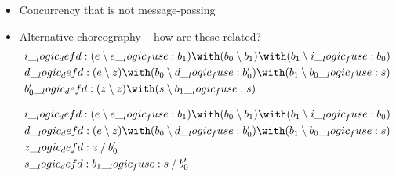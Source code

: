 \begin{itemize}
\item Concurrency that is not message-passing
\item Alternative choreography -- how are these related?
\begin{equation*}
  \begin{lgathered}
    i \defd (e \limp e \fuse b_1) \with (b_0 \limp b_1) \with (b_1 \limp i \fuse b_0) \\
    d \defd (e \limp z) \with (b_0 \limp d \fuse b'_0) \with (b_1 \limp b_0 \fuse s) \\
    b'_0 \defd (z \limp z) \with (s \limp b_1 \fuse s)
  \end{lgathered}
\end{equation*}

\begin{equation*}
  \begin{lgathered}
    i \defd (e \limp e \fuse b_1) \with (b_0 \limp b_1) \with (b_1 \limp i \fuse b_0) \\
    d \defd (e \limp z) \with (b_0 \limp d \fuse b'_0) \with (b_1 \limp b_0 \fuse s) \\
    z \defd z \pmir b'_0 \\
    s \defd b_1 \fuse s \pmir b'_0
  \end{lgathered}
\end{equation*}
\end{itemize}


\section{}



